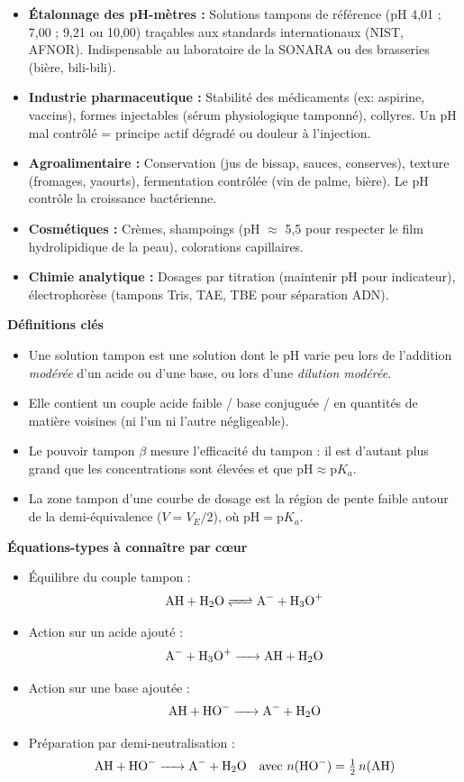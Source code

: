 \documentclass[11pt]{article}
\newcommand{\cle}[1]{{\popxbold\color{popdark}#1}}
\newcounter{popsec}
\newcounter{popsub}
\newcommand{\courssub}[1]{%
  \stepcounter{popsub}%
  \par\vspace{9pt}\noindent{\popxbold\fontsize{11.5}{13}\selectfont\color{popink}{\color{poporange}\thepopsec.\thepopsub}\hspace{6pt}#1}\par\nopagebreak\vspace{4pt}
}
\begin{document}
\begin{savaistu}
\begin{itemize}
  \item \textbf{Étalonnage des pH-mètres :} Solutions tampons de référence (pH 4,01 ; 7,00 ; 9,21 ou 10,00) traçables aux standards internationaux (NIST, AFNOR). Indispensable au laboratoire de la SONARA ou des brasseries (bière, bili-bili).
  \item \textbf{Industrie pharmaceutique :} Stabilité des médicaments (ex: aspirine, vaccins), formes injectables (sérum physiologique tamponné), collyres. Un pH mal contrôlé = principe actif dégradé ou douleur à l'injection.
  \item \textbf{Agroalimentaire :} Conservation (jus de bissap, sauces, conserves), texture (fromages, yaourts), fermentation contrôlée (vin de palme, bière). Le pH contrôle la croissance bactérienne.
  \item \textbf{Cosmétiques :} Crèmes, shampoings (pH $\approx$ 5,5 pour respecter le film hydrolipidique de la peau), colorations capillaires.
  \item \textbf{Chimie analytique :} Dosages par titration (maintenir pH pour indicateur), électrophorèse (tampons Tris, TAE, TBE pour séparation ADN).
\end{itemize}
\end{savaistu}

\courssub{Bilan synthétique}

\textbf{Définitions clés}
\begin{itemize}
  \item Une \cle{solution tampon} est une solution dont le \cle{pH varie peu} lors de l'addition \emph{modérée} d'un acide ou d'une base, ou lors d'une \emph{dilution modérée}.
  \item Elle contient un couple acide faible / base conjuguée / en quantités de matière \cle{voisines} (ni l'un ni l'autre négligeable).
  \item Le \cle{pouvoir tampon} $\beta$ mesure l'efficacité du tampon : il est d'autant plus grand que les concentrations sont élevées et que $\mathrm{pH} \approx \mathrm{p}K_a$.
  \item La \cle{zone tampon} d'une courbe de dosage est la région de pente faible autour de la \cle{demi-équivalence} ($V = V_E/2$), où $\mathrm{pH} = \mathrm{p}K_a$.
\end{itemize}

\textbf{Équations-types à connaître par cœur}
\begin{itemize}
  \item Équilibre du couple tampon : \[ \ce{AH + H2O <=> A- + H3O+} \]
  \item Action sur un acide ajouté : \[ \ce{A- + H3O+ -> AH + H2O} \]
  \item Action sur une base ajoutée : \[ \ce{AH + HO- -> A- + H2O} \]
  \item Préparation par demi-neutralisation : \[ \ce{AH + HO- -> A- + H2O} \quad \text{avec } n(\ce{HO-}) = \tfrac{1}{2}\,n(\ce{AH}) \]
\end{itemize}
\end{document}
